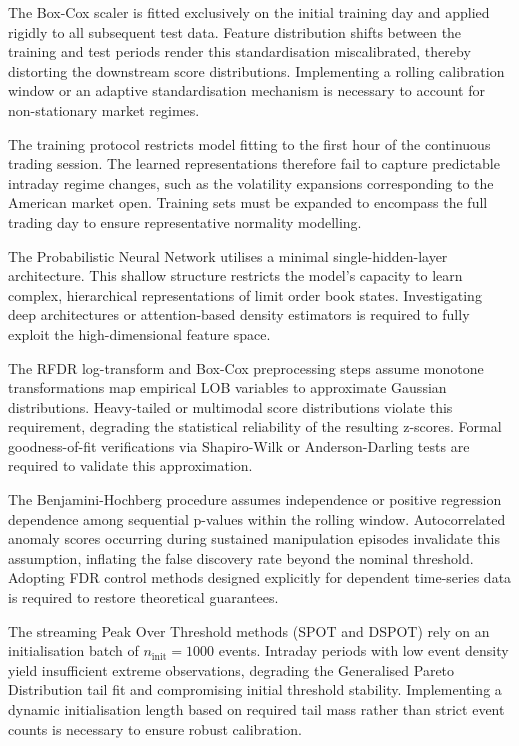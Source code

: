 \documentclass[11pt]{report}
\begin{document}
The Box-Cox scaler is fitted exclusively on the initial training day and applied rigidly to all subsequent test data. Feature distribution shifts between the training and test periods render this standardisation miscalibrated, thereby distorting the downstream score distributions. Implementing a rolling calibration window or an adaptive standardisation mechanism is necessary to account for non-stationary market regimes.

The training protocol restricts model fitting to the first hour of the continuous trading session. The learned representations therefore fail to capture predictable intraday regime changes, such as the volatility expansions corresponding to the American market open. Training sets must be expanded to encompass the full trading day to ensure representative normality modelling.

The Probabilistic Neural Network utilises a minimal single-hidden-layer architecture. This shallow structure restricts the model's capacity to learn complex, hierarchical representations of limit order book states. Investigating deep architectures or attention-based density estimators is required to fully exploit the high-dimensional feature space.

The RFDR log-transform and Box-Cox preprocessing steps assume monotone transformations map empirical LOB variables to approximate Gaussian distributions. Heavy-tailed or multimodal score distributions violate this requirement, degrading the statistical reliability of the resulting z-scores. Formal goodness-of-fit verifications via Shapiro-Wilk or Anderson-Darling tests are required to validate this approximation.

The Benjamini-Hochberg procedure assumes independence or positive regression dependence among sequential p-values within the rolling window. Autocorrelated anomaly scores occurring during sustained manipulation episodes invalidate this assumption, inflating the false discovery rate beyond the nominal threshold. Adopting FDR control methods designed explicitly for dependent time-series data is required to restore theoretical guarantees.

The streaming Peak Over Threshold methods (SPOT and DSPOT) rely on an initialisation batch of $n_{\text{init}} = 1000$ events. Intraday periods with low event density yield insufficient extreme observations, degrading the Generalised Pareto Distribution tail fit and compromising initial threshold stability. Implementing a dynamic initialisation length based on required tail mass rather than strict event counts is necessary to ensure robust calibration.
\end{document}
